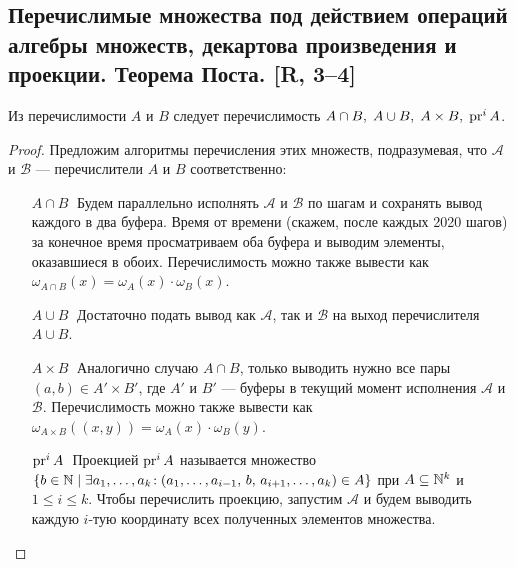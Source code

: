 \documentclass[a4paper, fleqn]{article}
\begin{document}
    \subsection{Перечислимые множества под действием операций алгебры множеств, декартова произведения и проекции. Теорема Поста. [R, 3--4]}

        \begin{proposition}
             Из перечислимости $A$ и $B$ следует перечислимость $A \cap B, \; A \cup B, \; A \times B, \; \operatorname{\mathop{\mathrm{pr}}}^i A$.
        \end{proposition}

        \begin{proof}
        Предложим алгоритмы перечисления этих множеств, подразумевая, что $\mathcal{A}$ и $\mathcal{B}$ --- перечислители $A$ и $B$ соответственно:

        \begin{enumerate}[leftmargin=15mm]
            \item[$A \cap B \;$] Будем параллельно исполнять $\mathcal{A}$ и $\mathcal{B}$ по шагам и сохранять вывод каждого в два буфера. Время от времени (скажем, после каждых 2020 шагов) за конечное время просматриваем оба буфера и выводим элементы, оказавшиеся в обоих. Перечислимость можно также вывести как $\omega_{A \cap B}(x) = \omega_{A}(x) \cdot \omega_B(x)$.

            \item[$A \cup B \;$] Достаточно подать вывод как $\mathcal{A}$, так и $\mathcal{B}$ на выход перечислителя $A \cup B$.

            \item[$A \times B \;$] Аналогично случаю $A \cap B$, только выводить нужно все пары $(a, b) \in A' \times B'$, где $A'$ и $B'$ --- буферы в текущий момент исполнения $\mathcal{A}$ и $\mathcal{B}$. Перечислимость можно также вывести как $\omega_{A \times B}((x, y)) = \omega_A(x) \cdot \omega_B(y)$.

            \item[$\operatorname{\mathop{\mathrm{pr}}}^i A \;$] Проекцией $\operatorname{\mathop{\mathrm{pr}}}^i A$ называется множество $\{ b \in \mathbb{N} \mid \exists a_1, \dots, a_k \!: (a_1, \dots, a_{i-1}, \, b, \, a_{i+1}, \dots, a_k) \in A \}$ при $A \subseteq \mathbb{N}^k$ и $1 \leq i \leq k$. Чтобы перечислить проекцию, запустим $\mathcal{A}$ и будем выводить каждую $i$-тую координату всех полученных элементов множества. \qedhere
        \end{enumerate}
        \end{proof}
\end{document}
